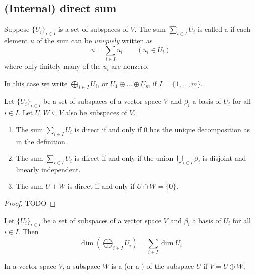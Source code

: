 \subsection{(Internal) direct sum}
\begin{definition}
Suppose $\{U_i\}_{i\in I}$ is a set of subspaces of $V$. The sum $\sum_{i\in I}U_i$ is called a  if each element $u$ of the sum can be \emph{uniquely} written as
\[ u = \sum_{i\in I}u_i \qquad (u_i\in U_i) \]
where only finitely many of the $u_i$ are nonzero.

In this case we write $\bigoplus_{i\in I} U_i$, or $U_1 \oplus \ldots \oplus U_m$ if $I = \{1,\ldots, m\}$. 
\end{definition}

\begin{proposition} \label{directSumCriterion}
Let $\{U_i\}_{i\in I}$ be a set of subspaces of a vector space $V$ and $\beta_i$ a basis of $U_i$ for all $i\in I$. Let $U,W\subseteq V$ also be subspaces of $V$.
\begin{enumerate}
\item The sum $\sum_{i\in I}U_i$ is direct \textup{if and only if} $0$ has the unique decomposition as in the definition.
\item The sum $\sum_{i\in I}U_i$ is direct \textup{if and only if} the union $\bigcup_{i\in I}\beta_i$ is disjoint and linearly independent.
\item The sum $U+W$ is direct \textup{if and only if} $U\cap W = \{0\}$.
\end{enumerate}
\end{proposition}
\begin{proof}
TODO
\end{proof}
\begin{corollary}
Let $\{U_i\}_{i\in I}$ be a set of subspaces of a vector space $V$ and $\beta_i$ a basis of $U_i$ for all $i\in I$. Then
\[ \dim\left(\bigoplus_{i \in I}U_i\right) = \sum_{i\in I} \dim U_i \]
\end{corollary}

\begin{definition}
In a vector space $V$, a subspace $W$ is a  (or a ) of the subspace $U$ if $V = U \oplus W$.
\end{definition}

